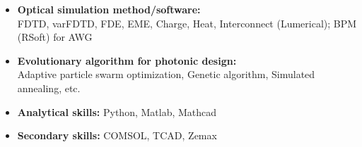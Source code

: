 \documentclass[10pt,a4paper,ragged2e]{altacv}
\begin{document}
\tagline{}

\begin{fullwidth}
\makecvheader
\end{fullwidth}




\begin{itemize}\normalsize
\justifying 
\item {\bf\large Optical simulation method/software: }\\
        FDTD, varFDTD, FDE, EME, Charge, Heat, Interconnect (Lumerical); BPM (RSoft) for AWG
\item {\bf\large Evolutionary algorithm for photonic design: }\\
        Adaptive particle swarm optimization, Genetic algorithm, Simulated annealing, etc.
\item {\bf\large Analytical skills: }
        Python, Matlab, Mathcad
\item {\bf\large Secondary skills: }
        COMSOL, TCAD, Zemax
\end{itemize}
\end{document}
